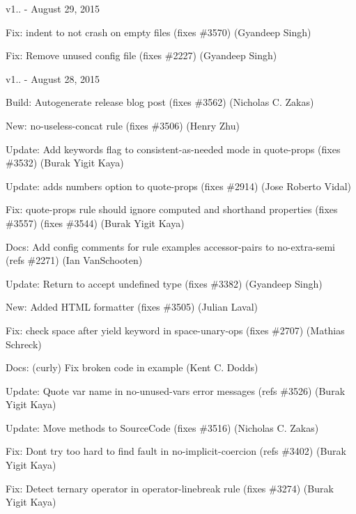v1.. -\/ August 29, 2015


\begin{DoxyItemize}
\item Fix\+: {\ttfamily indent} to not crash on empty files (fixes \#3570) (Gyandeep Singh)
\item Fix\+: Remove unused config file (fixes \#2227) (Gyandeep Singh)
\end{DoxyItemize}

v1.. -\/ August 28, 2015


\begin{DoxyItemize}
\item Build\+: Autogenerate release blog post (fixes \#3562) (Nicholas C. Zakas)
\item New\+: {\ttfamily no-\/useless-\/concat} rule (fixes \#3506) (Henry Zhu)
\item Update\+: Add {\ttfamily keywords} flag to {\ttfamily consistent-\/as-\/needed} mode in {\ttfamily quote-\/props} (fixes \#3532) (Burak Yigit Kaya)
\item Update\+: adds {\ttfamily numbers} option to quote-\/props (fixes \#2914) (Jose Roberto Vidal)
\item Fix\+: {\ttfamily quote-\/props} rule should ignore computed and shorthand properties (fixes \#3557) (fixes \#3544) (Burak Yigit Kaya)
\item Docs\+: Add config comments for rule examples \textquotesingle{}accessor-\/pairs\textquotesingle{} to \textquotesingle{}no-\/extra-\/semi\textquotesingle{} (refs \#2271) (Ian Van\+Schooten)
\item Update\+: Return to accept {\ttfamily undefined} type (fixes \#3382) (Gyandeep Singh)
\item New\+: Added H\+T\+ML formatter (fixes \#3505) (Julian Laval)
\item Fix\+: check space after yield keyword in space-\/unary-\/ops (fixes \#2707) (Mathias Schreck)
\item Docs\+: (curly) Fix broken code in example (Kent C. Dodds)
\item Update\+: Quote var name in {\ttfamily no-\/unused-\/vars} error messages (refs \#3526) (Burak Yigit Kaya)
\item Update\+: Move methods to Source\+Code (fixes \#3516) (Nicholas C. Zakas)
\item Fix\+: Don\textquotesingle{}t try too hard to find fault in {\ttfamily no-\/implicit-\/coercion} (refs \#3402) (Burak Yigit Kaya)
\item Fix\+: Detect ternary operator in operator-\/linebreak rule (fixes \#3274) (Burak Yigit Kaya)

\end{DoxyItemize}

